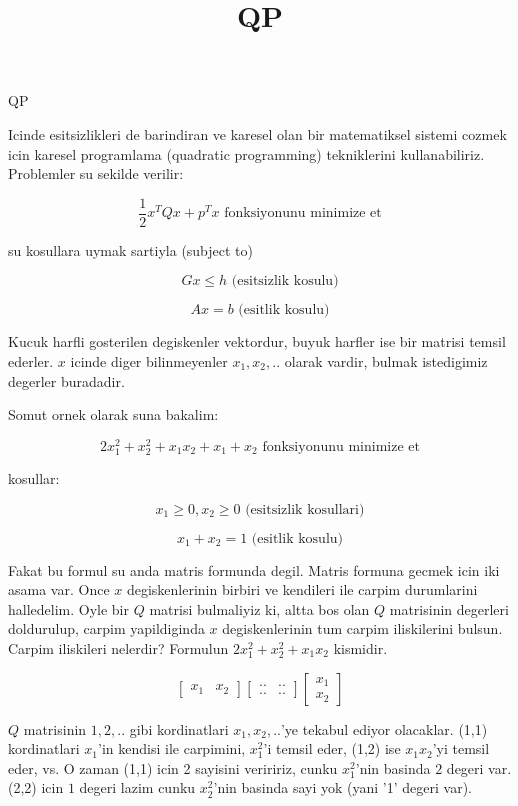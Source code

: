 \documentclass[12pt,fleqn]{article}
\begin{document}
\title{QP}

QP

Icinde esitsizlikleri de barindiran ve karesel olan bir matematiksel sistemi
cozmek icin karesel programlama (quadratic programming) tekniklerini
kullanabiliriz. Problemler su sekilde verilir:

\[ \frac{1}{2}x^TQx+p^Tx \textrm{ fonksiyonunu minimize et} \]

su kosullara uymak sartiyla (subject to)

\[ Gx \leq h \textrm{ (esitsizlik kosulu)} \]

\[ Ax = b \textrm{ (esitlik kosulu)} \]

Kucuk harfli gosterilen degiskenler vektordur, buyuk harfler ise bir matrisi
temsil ederler. $x$ icinde diger bilinmeyenler $x_1, x_2, ..$ olarak
vardir, bulmak istedigimiz degerler buradadir.

Somut ornek olarak suna bakalim:

\[ 2x_1^2 + x_2^2 + x_1x_2+x_1+x_2 \textrm{ fonksiyonunu minimize et} \]

kosullar:

\[ x_1 \geq 0, x_2 \geq 0 \textrm{ (esitsizlik kosullari)} \]

\[ x_1 + x_2 = 1 \textrm{ (esitlik kosulu)} \]

Fakat bu formul su anda matris formunda degil. Matris formuna gecmek icin iki
asama var. Once $x$ degiskenlerinin birbiri ve kendileri ile carpim durumlarini
halledelim. Oyle bir $Q$ matrisi bulmaliyiz ki, altta bos olan $Q$ matrisinin
degerleri doldurulup, carpim yapildiginda $x$ degiskenlerinin tum carpim
iliskilerini bulsun. Carpim iliskileri nelerdir?  Formulun $2x_1^2 + x_2^2 +
x_1x_2$ kismidir.

\[ 
\left[ \begin{array}{cc}
    x_1 & x_2 
\end{array} \right]
\left[ \begin{array}{cc}
    .. & .. \\
    .. & ..
\end{array} \right]
\left[ \begin{array}{c}
    x_1 \\
    x_2 
\end{array} \right]
 \]

$Q$ matrisinin $1,2,..$ gibi kordinatlari $x_1,x_2,..$'ye tekabul ediyor
olacaklar.  (1,1) kordinatlari $x_1$'in kendisi ile carpimini, $x_1^2$'i temsil
eder, (1,2) ise $x_1x_2$'yi temsil eder, vs. O zaman (1,1) icin 2 sayisini
veriririz, cunku $x_1^2$'nin basinda $2$ degeri var. (2,2) icin $1$ degeri lazim
cunku $x_2^2$'nin basinda sayi yok (yani '1' degeri var).
\end{document}
